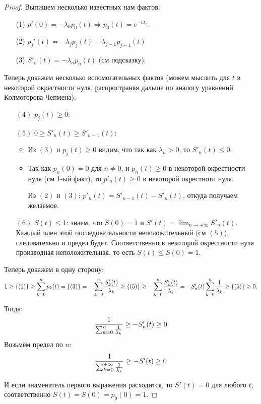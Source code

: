 \documentclass[12pt,a4paper]{extarticle}
\newcommand{\ra}{\rightarrow}
\begin{document}
	\begin{proof}
		Выпишем несколько известных нам фактов:
		\begin{itemize}
			\item[(1)] $p'(0) = -\lambda_0p_0(t) \Rightarrow p_0(t) = e^{-t\lambda_0}$.
			
			\item[(2)] $p_j'(t) = -\lambda_jp_j(t) + \lambda_{j-1}p_{j-1}(t)$ 
			
			\item[(3)] $S'_n(t) = -\lambda_n p_n(t)$ (см подсказку).
		\end{itemize}
	
		Теперь докажем несколько вспомогательных фактов (можем мыслить для $t$ в некоторой окрестности нуля, распространяя дальше по аналогу уравнений Колмогорова-Чепмена):
		\begin{itemize}
			\item[$(4)$] $p_j(t) \geq 0$:
					
			\item[$(5)$] $0 \geq S'_{n}(t) \geq S'_{n-1}(t)$: 
			\begin{itemize}
				\item Из $(3)$ и $p_j(t) \geq 0$ видим, что так как $\lambda_n > 0$, то $S'_n(t) \leq 0$.
				
				\item Так как $p_n(0) = 0$ для $n \neq 0$, и $p_n(t) \geq 0$ в некоторой окрестности нуля (см 1-ый факт), то $p'_n(t) \geq 0$ в некоторой окрестноти нуля.
				
				 Из $(2)$ и $(3)$: $p'_n(t) = S'_{n-1}(t) - S'_n(t)$, откуда получаем желаемое.
			\end{itemize}
		
			\item[$(6)$] $S(t) \leq 1$: знаем, что $S(0) = 1$ и $S'(t) = \lim_{n\ra +\infty} S'_n(t)$. Каждый член этой последовательности неположительный (см $(5)$), следовательно и предел будет. Соответственно в некоторой окрестности нуля производная неположительная, то есть $S(t) \leq S(0) = 1$.
		\end{itemize}
	
		Теперь докажем в одну сторону:
		\[
			1 \geq \{(1)\} \geq \sum_{k=0}^{n} p_k(t) = \{(3)\} =-\sum_{k=0}^n {S'_k(t) \over \lambda_k} \geq \{(5)\} \geq -\sum_{k=0}^n {S'_n(t) \over \lambda_k}  = -S'_n(t) \sum_{k=0}^n {1\over \lambda_k} \geq \{(5)\} \geq 0.
		\]
		
		Тогда:
		\[
			{1 \over \sum_{k=0}^n {1\over \lambda_k}} \geq -S_n'(t) \geq 0
		\]
		Возьмём предел по $n$:
		\[
			{1 \over \sum_{k=0}^{+\infty} {1\over \lambda_k}} \geq -S'(t) \geq 0
		\]
		
		И если знаменатель первого выражения расходится, то $S'(t) = 0$ для любого $t$, соответственно $S(t) = S(0) = p_0(0) = 1$.
		
	\end{proof}
\end{document}
